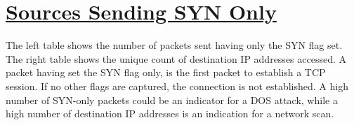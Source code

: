 %
%
%

\chapter[Sources Sending SYN Only]{\underline{Sources Sending SYN Only}}
\begin{flushleft}
%
The left table shows the number of packets sent having only the SYN flag set. The right table shows the unique count of destination IP addresses accessed. A packet having set the SYN flag only, is the first packet to establish a TCP session. If no other flags are captured, the connection is not established. A high number of SYN-only packets could be an indicator for a DOS attack, while a high number of destination IP addresses is an indication for a network scan.
%
\end{flushleft}

